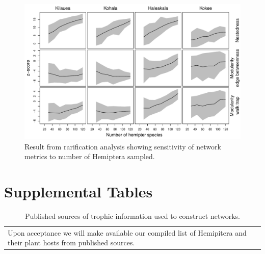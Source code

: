\documentclass[12pt]{article}
\begin{document}
\begin{figure}[!hp]
  \centering
  \includegraphics[scale=0.6]{../figSupp_rarified_prob1.pdf}
  \caption{Result from rarification analysis showing sensitivity of
    network metrics to number of Hemiptera sampled.}
  \label{figSupp:rfy}
\end{figure}

\clearpage

\section*{Supplemental Tables}

\begin{table}[!htb]
  \centering
  \begin{tabular}{p{\textwidth}}
    Upon acceptance we will make available our compiled list of
    Hemipitera and their plant hosts from published sources.
  \end{tabular}
  \caption{Published sources of trophic information used to construct networks.}
  \label{tab:networkPubs}
\end{table}
\end{document}
